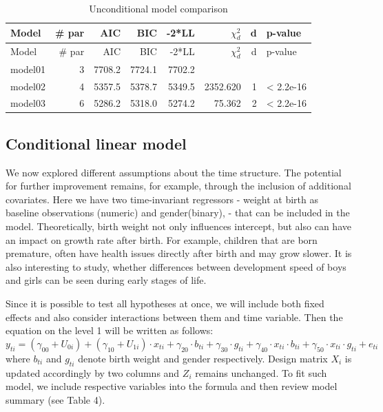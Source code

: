 \documentclass[
  12pt,
]{article}
\begin{document}
\begin{longtable}[]{@{}lrrrrrrl@{}}
\caption{Unconditional model comparison}\tabularnewline
\toprule\noalign{}
Model & \# par & AIC & BIC & -2*LL & \(\chi^2_d\) & d & p-value \\
\midrule\noalign{}
\endfirsthead
\toprule\noalign{}
Model & \# par & AIC & BIC & -2*LL & \(\chi^2_d\) & d & p-value \\
\midrule\noalign{}
\endhead
\bottomrule\noalign{}
\endlastfoot
model01 & 3 & 7708.2 & 7724.1 & 7702.2 & & & \\
model02 & 4 & 5357.5 & 5378.7 & 5349.5 & 2352.620 & 1 & \textless{}
2.2e-16 \\
model03 & 6 & 5286.2 & 5318.0 & 5274.2 & 75.362 & 2 & \textless{}
2.2e-16 \\
\end{longtable}

\subsection{Conditional linear model}\label{conditional-linear-model}

We now explored different assumptions about the time structure. The
potential for further improvement remains, for example, through the
inclusion of additional covariates. Here we have two time-invariant
regressors - weight at birth as baseline observations (numeric) and
gender(binary), - that can be included in the model. Theoretically,
birth weight not only influences intercept, but also can have an impact
on growth rate after birth. For example, children that are born
premature, often have health issues directly after birth and may grow
slower. It is also interesting to study, whether differences between
development speed of boys and girls can be seen during early stages of
life.

Since it is possible to test all hypotheses at once, we will include
both fixed effects and also consider interactions between them and time
variable. Then the equation on the level 1 will be written as follows:
\[
y_{ti} = (\gamma_{00} + U_{0i}) + (\gamma_{10} + U_{1i}) \cdot x_{ti} + \gamma_{20} \cdot b_{ti} + \gamma_{30} \cdot g_{ti} + \gamma_{40} \cdot x_{ti}\cdot b_{ti} + \gamma_{50} \cdot x_{ti}\cdot g_{ti} + e_{ti}
\] where \(b_{ti}\) and \(g_{ti}\) denote birth weight and gender
respectively. Design matrix \(X_i\) is updated accordingly by two
columns and \(Z_i\) remains unchanged. To fit such model, we include
respective variables into the formula and then review model summary (see
Table 4).
\end{document}
